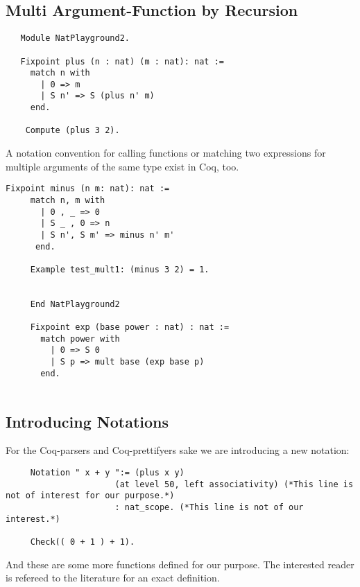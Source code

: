    \subsection{Multi Argument-Function by Recursion}
   
   \begin{lstlisting}
   Module NatPlayground2.
   
   Fixpoint plus (n : nat) (m : nat): nat :=
     match n with
       | 0 => m
       | S n' => S (plus n' m)
     end.
     
    Compute (plus 3 2). 
   \end{lstlisting}
   
    A notation convention for calling functions or matching two expressions for multiple arguments of the same type exist in Coq, too.
   
   \begin{lstlisting}[label = lst:minus_nat, caption={ \lstinline!minus! and \lstinline!exp!}]
    Fixpoint minus (n m: nat): nat :=
     match n, m with
       | 0 , _ => 0
       | S _ , 0 => n
       | S n', S m' => minus n' m'
      end.
      
     Example test_mult1: (minus 3 2) = 1.
     
      
     End NatPlayground2
     
     Fixpoint exp (base power : nat) : nat :=
       match power with
         | 0 => S 0
         | S p => mult base (exp base p)
       end.
         
   \end{lstlisting}
        
   \subsection{Introducing Notations}


    For the Coq-parsers and Coq-prettifyers sake we are introducing a new notation:
    
    \begin{lstlisting}
     Notation " x + y ":= (plus x y)
                      (at level 50, left associativity) (*This line is not of interest for our purpose.*)
                      : nat_scope. (*This line is not of our interest.*)
                      
     Check(( 0 + 1 ) + 1).
    \end{lstlisting} 
   
   And these are some more functions defined for our purpose. 
   The interested reader is refereed to the literature for an exact definition.  
   
